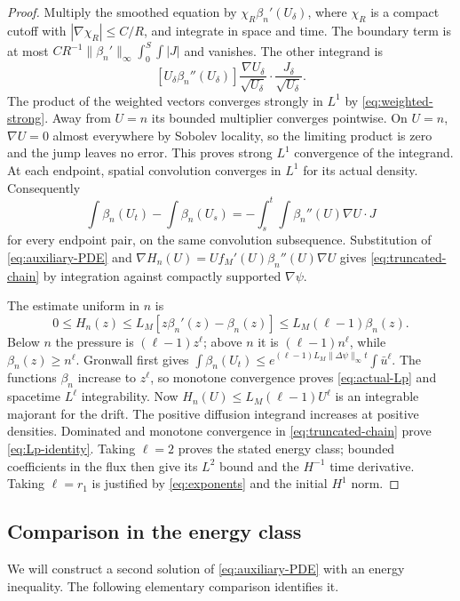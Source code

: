 \documentclass[11pt]{article}
\numberwithin{equation}{section}
\theoremstyle{definition}
\theoremstyle{remark}
\newcommand{\norm}[1]{\lVert #1\rVert}
\begin{document}
\begin{proof}
Multiply the smoothed equation by
$\chi_R\beta_n'(U_\delta)$, where $\chi_R$ is a compact cutoff with
$|\nabla\chi_R|\le C/R$, and integrate in space and time. The boundary
term is at most
$C R^{-1}\norm{\beta_n'}_\infty\int_0^S\int|J|$ and vanishes.
The other integrand is
\[
 [U_\delta\beta_n''(U_\delta)]
       \frac{\nabla U_\delta}{\sqrt{U_\delta}}
                  \cdot\frac{J_\delta}{\sqrt{U_\delta}}.
\]
The product of the weighted vectors converges strongly in $L^1$ by
\eqref{eq:weighted-strong}. Away from $U=n$ its bounded multiplier
converges pointwise. On $U=n$, $\nabla U=0$ almost everywhere by Sobolev
locality, so the limiting product is zero and the jump leaves no error.
This proves strong $L^1$ convergence of the integrand.
At each endpoint, spatial convolution converges in $L^1$ for its actual
density. Consequently
\[
 \int\beta_n(U_t)-\int\beta_n(U_s)
             =-\int_s^t\!\int\beta_n''(U)\nabla U\cdot J
\]
for every endpoint pair, on the same convolution subsequence. Substitution
of \eqref{eq:auxiliary-PDE} and
$\nabla H_n(U)=Uf_M'(U)\beta_n''(U)\nabla U$ gives
\eqref{eq:truncated-chain} by integration against compactly supported
$\nabla\psi$.

The estimate uniform in $n$ is
\[
 0\le H_n(z)\le L_M[z\beta_n'(z)-\beta_n(z)]
                 \le L_M(\ell-1)\beta_n(z).
\]
Below $n$ the pressure is $(\ell-1)z^\ell$; above $n$ it is
$(\ell-1)n^\ell$, while $\beta_n(z)\ge n^\ell$.
Gronwall first gives
$\int\beta_n(U_t)\le e^{(\ell-1)L_M\norm{\Delta\psi}_\infty t}
\int\bar u^\ell$.
The functions $\beta_n$ increase to $z^\ell$, so monotone convergence
proves \eqref{eq:actual-Lp} and spacetime $L^\ell$ integrability.
Now $H_n(U)\le L_M(\ell-1)U^\ell$ is an integrable majorant for the
drift. The positive diffusion integrand increases at positive densities.
Dominated and monotone convergence in \eqref{eq:truncated-chain} prove
\eqref{eq:Lp-identity}. Taking $\ell=2$ proves the stated energy class;
bounded coefficients in the flux then give its $L^2$ bound and the
$H^{-1}$ time derivative. Taking $\ell=r_1$ is justified by
\eqref{eq:exponents} and the initial $H^1$ norm.
\end{proof}

\subsection{Comparison in the energy class}
We will construct a second solution of \eqref{eq:auxiliary-PDE} with an
energy inequality. The following elementary comparison identifies it.
\end{document}
